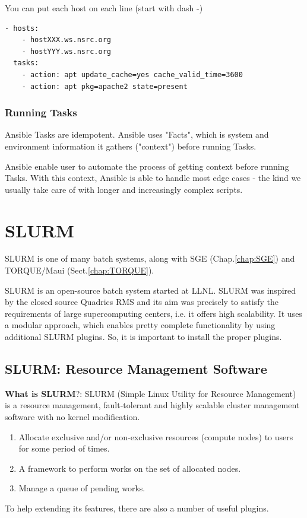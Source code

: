 You can put each host on each line (start with dash -)
\begin{verbatim}
- hosts:
    - hostXXX.ws.nsrc.org
    - hostYYY.ws.nsrc.org
  tasks:
    - action: apt update_cache=yes cache_valid_time=3600
    - action: apt pkg=apache2 state=present
\end{verbatim}


  
\subsection{Running Tasks}
\label{sec:Tasks-Ansible}

Ansible Tasks are idempotent. Ansible uses "Facts", which is system and
environment information it gathers ("context") before running Tasks.

Ansible enable user to automate the process of getting context before running
Tasks. With this context, Ansible is able to handle most edge cases - the kind
we usually take care of with longer and increasingly complex scripts.



  
\chapter{SLURM}
\label{chap:SLURM}

SLURM is one of many batch systems, along with SGE
(Chap.\ref{chap:SGE}) and TORQUE/Maui (Sect.\ref{chap:TORQUE}).

SLURM is an open-source batch system started at LLNL.
SLURM was inspired by the closed source Quadrics RMS and its aim was precisely
to satisfy the requirements of large supercomputing centers, i.e. it offers high
scalability. It uses a modular approach, which enables pretty complete
functionality by using additional SLURM plugins. So, it is important to install
the proper plugins.


\section{SLURM: Resource Management Software}
\label{sec:SLURM}


{\bf What is SLURM}?: SLURM (Simple Linux Utility for Resource Management) is a
resource management, fault-tolerant and highly scalable cluster management
software with no kernel modification.
\begin{enumerate}
  \item Allocate exclusive and/or non-exclusive resources (compute nodes) to
  users for some period of times.
  \item A framework to perform works on the set of allocated nodes.
  \item Manage a queue of pending works.
\end{enumerate}
To help extending its features, there are also a number of useful plugins.

